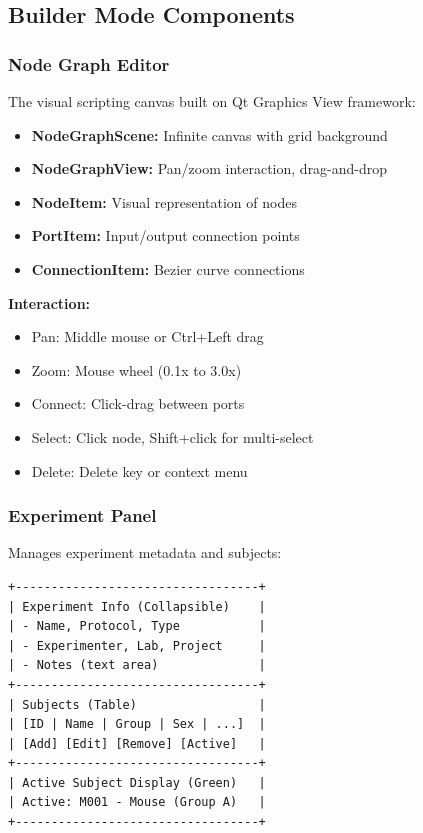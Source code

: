 \documentclass[11pt,a4paper]{article}
\begin{document}
\subsection{Builder Mode Components}

\subsubsection{Node Graph Editor}

The visual scripting canvas built on Qt Graphics View framework:

\begin{itemize}    \item \textbf{NodeGraphScene:} Infinite canvas with grid background
    \item \textbf{NodeGraphView:} Pan/zoom interaction, drag-and-drop
    \item \textbf{NodeItem:} Visual representation of nodes
    \item \textbf{PortItem:} Input/output connection points
    \item \textbf{ConnectionItem:} Bezier curve connections
\end{itemize}

\textbf{Interaction:}
\begin{itemize}    \item Pan: Middle mouse or Ctrl+Left drag
    \item Zoom: Mouse wheel (0.1x to 3.0x)
    \item Connect: Click-drag between ports
    \item Select: Click node, Shift+click for multi-select
    \item Delete: Delete key or context menu
\end{itemize}

\subsubsection{Experiment Panel}

Manages experiment metadata and subjects:

\begin{verbatim}
+----------------------------------+
| Experiment Info (Collapsible)    |
| - Name, Protocol, Type           |
| - Experimenter, Lab, Project     |
| - Notes (text area)              |
+----------------------------------+
| Subjects (Table)                 |
| [ID | Name | Group | Sex | ...]  |
| [Add] [Edit] [Remove] [Active]   |
+----------------------------------+
| Active Subject Display (Green)   |
| Active: M001 - Mouse (Group A)   |
+----------------------------------+
\end{verbatim}
\end{document}
